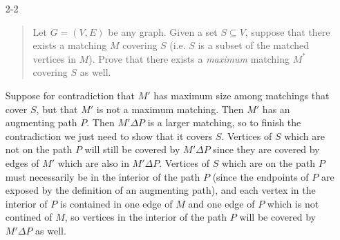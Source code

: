 \documentclass[12pt]{article}
\begin{document}
\begin{enumerate}




\item[2-2]
\begin{quote}
Let $G=(V,E)$ be any graph. Given a set
$S\subseteq V$, suppose that there exists a matching $M$ covering $S$
(i.e. $S$ is a subset of the matched vertices in $M$). Prove that
there exists a {\it maximum} matching $M^*$ covering $S$ as well.
\end{quote}
Suppose for contradiction that $M'$ has maximum size among matchings that cover $S$, but that $M'$ is not a maximum matching. Then $M'$ has an augmenting path $P$. Then $M'\Delta P$ is a larger matching, so to finish the contradiction we just need to show that it covers $S$. Vertices of $S$ which are not on the path $P$ will still be covered by $M'\Delta P$ since they are covered by edges of $M'$ which are also in $M'\Delta P$. Vertices of $S$ which are on the path $P$ must necessarily be in the interior of the path $P$ (since the endpoints of $P$ are exposed by the definition of an augmenting path), and each vertex in the interior of $P$ is contained in one edge of $M$ and one edge of $P$ which is not contined of $M$, so vertices in the interior of the path $P$ will be covered by $M'\Delta P$ as well.


\end{enumerate}
\end{document}
